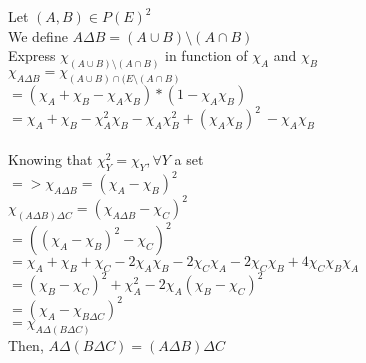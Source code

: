 \documentclass{article}
\begin{document}
\noindent Let $(A, B) \in P(E)^2$\\
We define $A \Delta B = (A \cup B) \setminus (A \cap B)$\\
Express $ \chi_{(A \cup B) \setminus (A \cap B)} $ in function of $ \chi_A$ and $\chi_B$\\

\noindent
$ \chi_{A \Delta B}  = \chi_{(A\cup B)\cap (E \setminus (A\cap B)}$\\
$ =  (\chi_{A} + \chi_{B} - \chi_{A}\chi_{B}) * (1 - \chi_{A}\chi_{B})$\\
$ = \chi_{A} + \chi_{B} - \chi_{A}^2\chi_{B} - \chi_{A}\chi_{B}^2 + (\chi_{A}\chi_{B})^2 \ - \chi_{A}\chi_{B}$\\\\
Knowing that $\chi_{Y}^2 = \chi_{Y}, \forall Y $ a set\\
$=> \chi_{A\Delta B} = (\chi_{A} - \chi_{B})^2$\\

\noindent $\chi_{(A\Delta B) \Delta C} =
(\chi_{A\Delta B} - \chi_{C})^2$\\
$= ((\chi_{A} - \chi_{B})^2 - \chi_C)^2 $\\
$= \chi_A + \chi_{B} + \chi_C - 2\chi_A\chi_B - 2\chi_C\chi_A - 2\chi_C\chi_B + 4\chi_C\chi_B\chi_A $\\
$= (\chi_B - \chi_C)^2 + \chi_A^2 - 2\chi_A(\chi_B - \chi_C)^2$\\
$= (\chi_A - \chi_{B\Delta C})^2$\\
$= \chi_{A\Delta (B\Delta C)}$\\
Then, $A\Delta(B\Delta C) = (A\Delta B) \Delta C$
\end{document}
